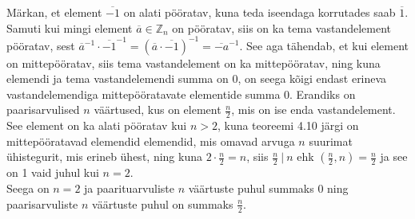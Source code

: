 \documentclass[a4paper, 10pt]{article}
\newcommand{\Z}{\mathbb{Z}}
\newcommand{\w}{\overline}
\begin{document}
\bigskip
Märkan, et element $\w{-1}$ on alati pööratav, kuna teda iseendaga korrutades saab $\w1$. Samuti kui mingi element $\w a\in\Z_n$ on pööratav, siis on ka tema vastandelement pööratav, sest $\w a^{-1}\cdot \w{-1}^{-1}=(\w a\cdot\w{-1})^{-1}=\w{-a}^{-1}$. See aga tähendab, et kui element on mittepööratav, siis tema vastandelement on ka mittepööratav, ning kuna elemendi ja tema vastandelemendi summa on 0, on seega kõigi endast erineva vastandelemendiga mittepööratavate elementide summa 0. Erandiks on paarisarvulised $n$ väärtused, kus on element $\frac n2$, mis on ise enda vastandelement. See element on ka alati pööratav kui $n>2$, kuna teoreemi 4.10 järgi on mittepööratavad elemendid elemendid, mis omavad arvuga $n$ suurimat ühistegurit, mis erineb ühest, ning kuna $2\cdot\frac n2=n$, siis $\frac n2\ |\ n$ ehk $(\frac n2,n)=\frac n2$ ja see on 1 vaid juhul kui $n=2$.\\
Seega on $n=2$ ja paarituarvuliste $n$ väärtuste puhul summaks 0 ning paarisarvuliste $n$ väärtuste puhul on summaks $\frac n2$.
\bigskip
\end{document}
